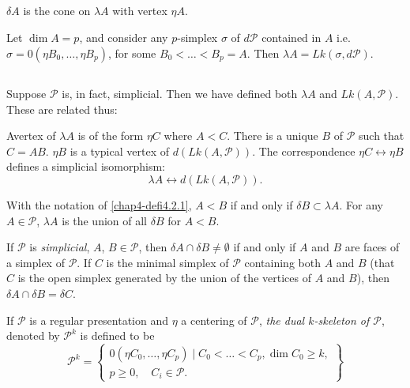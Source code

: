 \subsection{}\label{chap4-sec4.2.3}
$\delta A$ is the cone on $\lambda A$ with vertex $\eta A$.

\setcounter{proposition}{3}
\begin{ex}\label{chap4-ex4.2.4}
Let $\dim A=p$, and consider any $p$-simplex $\sigma$ of $d\mathscr{P}$ contained in $A$ i.e. $\sigma=0(\eta B_{0},\ldots, \eta B_{p})$, for some $B_{0}<\ldots<B_{p}=A$. Then $\lambda A=Lk(\sigma,d\mathscr{P})$.
\end{ex}

\setcounter{subsection}{4}
\subsection{}\label{chap4-sec4.2.5}
Suppose $\mathscr{P}$ is, in fact, simplicial. Then we have defined both $\lambda A$ and $Lk(A,\mathscr{P})$. These are related thus:

A\pageoriginale vertex of $\lambda A$ is of the form $\eta C$ where $A<C$. There is a unique $B$ of $\mathscr{P}$ such that $C=AB$. $\eta B$ is a typical vertex of $d(Lk(A,\mathscr{P}))$. The correspondence $\eta C\leftrightarrow \eta B$ defines a simplicial isomorphism:
$$
\lambda A\leftrightarrow d(Lk(A,\mathscr{P})).
$$

\setcounter{proposition}{5}
\begin{ex}\label{chap4-ex4.2.6}
With the notation of \ref{chap4-defi4.2.1}, $A<B$ if and only if $\delta B\subset \lambda A$. For any $A\in \mathscr{P}$, $\lambda A$ is the union of all $\delta B$ for $A<B$.
\end{ex}

\begin{ex}\label{chap4-ex4.2.7}
If $\mathscr{P}$ is {\em simplicial}, $A$, $B\in\mathscr{P}$, then $\delta A\cap \delta B\neq \emptyset$ if and only if $A$ and $B$ are faces of a simplex of $\mathscr{P}$. If $C$ is the minimal simplex of $\mathscr{P}$ containing both $A$ and $B$ (that $C$ is the open simplex generated by the union of the vertices of $A$ and $B$), then $\delta A\cap \delta B=\delta C$.
\end{ex}

\begin{definition}\label{chap4-defi4.2.8}
If $\mathscr{P}$ is a regular presentation and $\eta$ a centering of $\mathscr{P}$, {\em the dual $k$-skeleton of $\mathscr{P}$}, denoted by $\mathscr{P}^{k}$ is defined to be
$$
\mathscr{P}^{k}=
\left\{
\begin{array}{rr}
0(\eta C_{0},\ldots,\eta C_{p})\mid C_{0}<\ldots<C_{p},\dim C_{0}\geq k,\\
p\geq 0,\quad C_{i}\in \mathscr{P}.\qquad
\end{array}
\right\}
$$
\end{definition}

